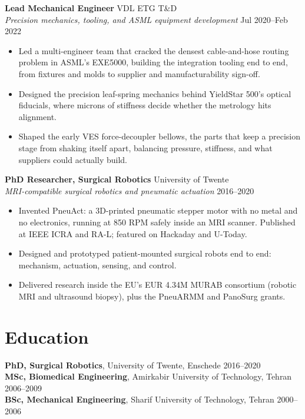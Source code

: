\documentclass[10pt,a4paper]{article}
\begin{document}
\vspace{4pt}
\textbf{Lead Mechanical Engineer} \hfill VDL ETG T\&D \\
{\small\textit{Precision mechanics, tooling, and ASML equipment development}} \hfill {\small Jul 2020--Feb 2022}
\begin{itemize}
  \item Led a multi-engineer team that cracked the densest cable-and-hose routing problem in ASML's EXE5000, building the integration tooling end to end, from fixtures and molds to supplier and manufacturability sign-off.
  \item Designed the precision leaf-spring mechanics behind YieldStar 500's optical fiducials, where microns of stiffness decide whether the metrology hits alignment.
  \item Shaped the early VES force-decoupler bellows, the parts that keep a precision stage from shaking itself apart, balancing pressure, stiffness, and what suppliers could actually build.
\end{itemize}

\vspace{4pt}
\textbf{PhD Researcher, Surgical Robotics} \hfill University of Twente \\
{\small\textit{MRI-compatible surgical robotics and pneumatic actuation}} \hfill {\small 2016--2020}
\begin{itemize}
  \item Invented PneuAct: a 3D-printed pneumatic stepper motor with no metal and no electronics, running at 850 RPM safely inside an MRI scanner. Published at IEEE ICRA and RA-L; featured on Hackaday and U-Today.
  \item Designed and prototyped patient-mounted surgical robots end to end: mechanism, actuation, sensing, and control.
  \item Delivered research inside the EU's EUR 4.34M MURAB consortium (robotic MRI and ultrasound biopsy), plus the PneuARMM and PanoSurg grants.
\end{itemize}

\section{Education}

\textbf{PhD, Surgical Robotics}, University of Twente, Enschede \hfill 2016--2020 \\[2pt]
\textbf{MSc, Biomedical Engineering}, Amirkabir University of Technology, Tehran \hfill 2006--2009 \\[2pt]
\textbf{BSc, Mechanical Engineering}, Sharif University of Technology, Tehran \hfill 2000--2006
\end{document}
